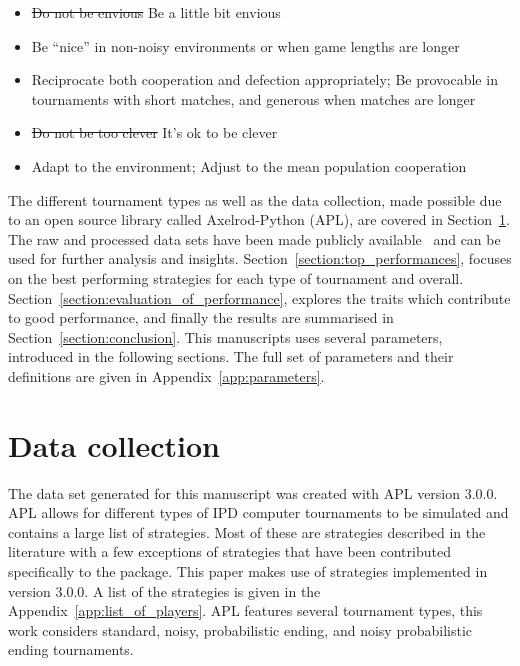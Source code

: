 \documentclass{article}
\newcommand{\numberofstrategies}{}
\begin{document}
\begin{itemize}
    \item \st{Do not be envious} Be a little bit envious
    \item Be ``nice'' in non-noisy environments or when game lengths are longer
    \item Reciprocate both cooperation and defection appropriately;
    Be provocable in tournaments with short matches, and generous when matches are longer
    \item \st{Do not be too clever} It's ok to be clever
    \item Adapt to the environment; Adjust to the mean population cooperation
\end{itemize}

The different tournament types as well as the data collection, made
possible due to an open source library called Axelrod-Python (APL),
are covered in Section~\ref{section:data_collection}. The raw and processed data
sets have been made publicly available~\cite{data, raw_data} and can be used
for further analysis and insights.
Section~\ref{section:top_performances}, focuses on the best performing
strategies for each type of tournament and overall.
Section~\ref{section:evaluation_of_performance}, explores the traits which
contribute to good performance, and finally the results are summarised in
Section~\ref{section:conclusion}. This manuscripts uses several parameters,
introduced in the following sections. The full set of
parameters and their definitions are given in Appendix~\ref{app:parameters}.

\section{Data collection}\label{section:data_collection}

The data set generated for this manuscript was created with APL version 3.0.0.
APL allows for different types of IPD computer
tournaments to be simulated and contains a large list of strategies.
Most of these are strategies described in the literature with a few exceptions
of strategies that have been contributed specifically to the package. This
paper makes use of \numberofstrategies strategies implemented in version 3.0.0. A
list of the strategies is given in the Appendix~\ref{app:list_of_players}.
APL features several tournament types, this work considers
standard, noisy, probabilistic ending, and noisy probabilistic ending
tournaments.
\end{document}

